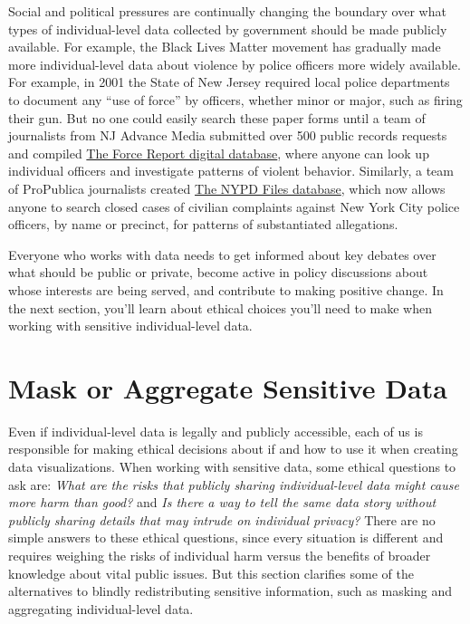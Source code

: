 \documentclass[
  english,
]{book}
\begin{document}
Social and political pressures are continually changing the boundary over what types of individual-level data collected by government should be made publicly available. For example, the Black Lives Matter movement has gradually made more individual-level data about violence by police officers more widely available. For example, in 2001 the State of New Jersey required local police departments to document any ``use of force'' by officers, whether minor or major, such as firing their gun. But no one could easily search these paper forms until a team of journalists from NJ Advance Media submitted over 500 public records requests and compiled \href{https://force.nj.com/}{The Force Report digital database}, where anyone can look up individual officers and investigate patterns of violent behavior. Similarly, a team of ProPublica journalists created \href{https://projects.propublica.org/nypd-ccrb/}{The NYPD Files database}, which now allows anyone to search closed cases of civilian complaints against New York City police officers, by name or precinct, for patterns of substantiated allegations.

Everyone who works with data needs to get informed about key debates over what should be public or private, become active in policy discussions about whose interests are being served, and contribute to making positive change. In the next section, you'll learn about ethical choices you'll need to make when working with sensitive individual-level data.

\hypertarget{mask-aggregate}{%
\section*{Mask or Aggregate Sensitive Data}\label{mask-aggregate}}

Even if individual-level data is legally and publicly accessible, each of us is responsible for making ethical decisions about if and how to use it when creating data visualizations. When working with sensitive data, some ethical questions to ask are: \emph{What are the risks that publicly sharing individual-level data might cause more harm than good?} and \emph{Is there a way to tell the same data story without publicly sharing details that may intrude on individual privacy?} There are no simple answers to these ethical questions, since every situation is different and requires weighing the risks of individual harm versus the benefits of broader knowledge about vital public issues. But this section clarifies some of the alternatives to blindly redistributing sensitive information, such as masking and aggregating individual-level data.
\end{document}

